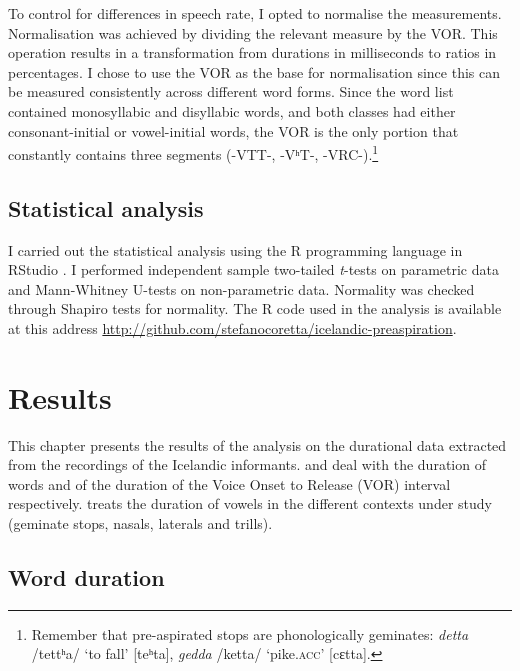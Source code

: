 \documentclass[11pt,a4paper,openany]{memoir}\usepackage[]{graphicx}\usepackage[]{color}
\begin{document}
To control for differences in speech rate, I opted to normalise the measurements.
Normalisation was achieved by dividing the relevant measure by the VOR.
This operation results in a transformation from durations in milliseconds to ratios in percentages.
I chose to use the VOR as the base for normalisation since this can be measured consistently across different word forms.
Since the word list contained monosyllabic and disyllabic words, and both classes had either consonant-initial or vowel-initial words, the VOR is the only portion that constantly contains three segments (-VTT-, -VʰT-, -VRC-).\footnote{Remember that pre-aspirated stops are phonologically geminates: \textit{detta} /tettʰa/ `to fall' [teʰta], \textit{gedda} /ketta/ `pike.\textsc{acc}' [cɛtta].}

\section{Statistical analysis}
\label{s:stats}
I carried out the statistical analysis using the R programming language \citep{r-core-team2015} in RStudio \citep{rstudio-team2015}.
I performed independent sample two-tailed \textit{t}-tests on parametric data and Mann-Whitney U-tests on non-parametric data.
Normality was checked through Shapiro tests for normality.
The R code used in the analysis is available at this address \url{http://github.com/stefanocoretta/icelandic-preaspiration}.













\chapter{Results}
\label{c:results}

This chapter presents the results of the analysis on the durational data extracted from the recordings of the Icelandic informants.
 and  deal with the duration of words and of the duration of the Voice Onset to Release (VOR) interval respectively.
 treats the duration of vowels in the different contexts under study (geminate stops, nasals, laterals and trills).


\section{Word duration}
\label{s:wordduration}
\end{document}
